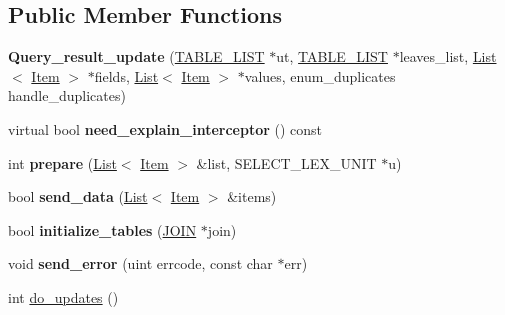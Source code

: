 \subsection*{Public Member Functions}
\begin{DoxyCompactItemize}
\item 
\mbox{\label{classQuery__result__update_a083a5373c634848616f1b55102abb350}} 
{\bfseries Query\+\_\+result\+\_\+update} (\mbox{\hyperlink{structTABLE__LIST}{T\+A\+B\+L\+E\+\_\+\+L\+I\+ST}} $\ast$ut, \mbox{\hyperlink{structTABLE__LIST}{T\+A\+B\+L\+E\+\_\+\+L\+I\+ST}} $\ast$leaves\+\_\+list, \mbox{\hyperlink{classList}{List}}$<$ \mbox{\hyperlink{classItem}{Item}} $>$ $\ast$fields, \mbox{\hyperlink{classList}{List}}$<$ \mbox{\hyperlink{classItem}{Item}} $>$ $\ast$values, enum\+\_\+duplicates handle\+\_\+duplicates)
\item 
\mbox{\label{classQuery__result__update_a78cea1735a661968614564d453f4707e}} 
virtual bool {\bfseries need\+\_\+explain\+\_\+interceptor} () const
\item 
\mbox{\label{classQuery__result__update_a7806b1dcb06acf64872055d2f91552dd}} 
int {\bfseries prepare} (\mbox{\hyperlink{classList}{List}}$<$ \mbox{\hyperlink{classItem}{Item}} $>$ \&list, S\+E\+L\+E\+C\+T\+\_\+\+L\+E\+X\+\_\+\+U\+N\+IT $\ast$u)
\item 
\mbox{\label{classQuery__result__update_a3bbc364d61350d2cb09c8d99fbbdcb1e}} 
bool {\bfseries send\+\_\+data} (\mbox{\hyperlink{classList}{List}}$<$ \mbox{\hyperlink{classItem}{Item}} $>$ \&items)
\item 
\mbox{\label{classQuery__result__update_a1a51a38fc7a113d301db38c37dbc37c6}} 
bool {\bfseries initialize\+\_\+tables} (\mbox{\hyperlink{classJOIN}{J\+O\+IN}} $\ast$join)
\item 
\mbox{\label{classQuery__result__update_ae6e08182beb4de1fa6f78b7b293e137a}} 
void {\bfseries send\+\_\+error} (uint errcode, const char $\ast$err)
\item 
int \mbox{\hyperlink{classQuery__result__update_a97533c9e11f7a077ae46d05d539866fe}{do\+\_\+updates}} ()
\item 

\end{DoxyCompactItemize}
